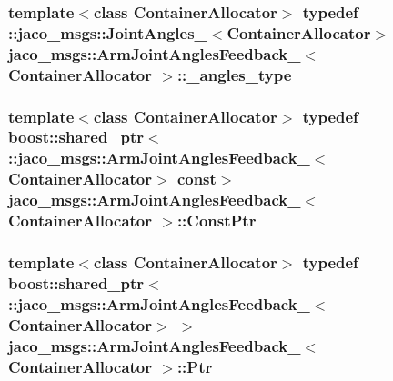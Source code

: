 \subsubsection[{\texorpdfstring{\+\_\+angles\+\_\+type}{_angles_type}}]{\setlength{\rightskip}{0pt plus 5cm}template$<$class Container\+Allocator$>$ typedef \+::{\bf jaco\+\_\+msgs\+::\+Joint\+Angles\+\_\+}$<$Container\+Allocator$>$ {\bf jaco\+\_\+msgs\+::\+Arm\+Joint\+Angles\+Feedback\+\_\+}$<$ Container\+Allocator $>$\+::{\bf \+\_\+angles\+\_\+type}}\hypertarget{structjaco__msgs_1_1ArmJointAnglesFeedback___a629bebf796b19c402987a577a7713b39}{}\label{structjaco__msgs_1_1ArmJointAnglesFeedback___a629bebf796b19c402987a577a7713b39}
\subsubsection[{\texorpdfstring{Const\+Ptr}{ConstPtr}}]{\setlength{\rightskip}{0pt plus 5cm}template$<$class Container\+Allocator$>$ typedef boost\+::shared\+\_\+ptr$<$ \+::{\bf jaco\+\_\+msgs\+::\+Arm\+Joint\+Angles\+Feedback\+\_\+}$<$Container\+Allocator$>$ const$>$ {\bf jaco\+\_\+msgs\+::\+Arm\+Joint\+Angles\+Feedback\+\_\+}$<$ Container\+Allocator $>$\+::{\bf Const\+Ptr}}\hypertarget{structjaco__msgs_1_1ArmJointAnglesFeedback___a6f2b04c0ed8a6cfe0463ec2bbec1ee84}{}\label{structjaco__msgs_1_1ArmJointAnglesFeedback___a6f2b04c0ed8a6cfe0463ec2bbec1ee84}
\subsubsection[{\texorpdfstring{Ptr}{Ptr}}]{\setlength{\rightskip}{0pt plus 5cm}template$<$class Container\+Allocator$>$ typedef boost\+::shared\+\_\+ptr$<$ \+::{\bf jaco\+\_\+msgs\+::\+Arm\+Joint\+Angles\+Feedback\+\_\+}$<$Container\+Allocator$>$ $>$ {\bf jaco\+\_\+msgs\+::\+Arm\+Joint\+Angles\+Feedback\+\_\+}$<$ Container\+Allocator $>$\+::{\bf Ptr}}\hypertarget{structjaco__msgs_1_1ArmJointAnglesFeedback___a6ff881b1ba9022ce71ca77ce3dba47c8}{}\label{structjaco__msgs_1_1ArmJointAnglesFeedback___a6ff881b1ba9022ce71ca77ce3dba47c8}

